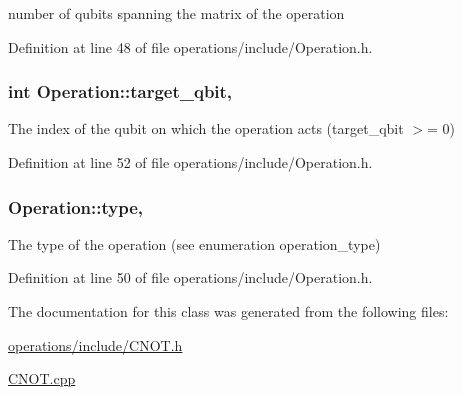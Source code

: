 number of qubits spanning the matrix of the operation 



Definition at line 48 of file operations/include/\+Operation.\+h.

\subsubsection[{\texorpdfstring{target\+\_\+qbit}{target_qbit}}]{\setlength{\rightskip}{0pt plus 5cm}int Operation\+::target\+\_\+qbit\hspace{0.3cm}{\ttfamily [protected]}, {\ttfamily [inherited]}}\hypertarget{class_operation_a3e489b72c124b494777c71b1646bb1e9}{}\label{class_operation_a3e489b72c124b494777c71b1646bb1e9}


The index of the qubit on which the operation acts (target\+\_\+qbit $>$= 0) 



Definition at line 52 of file operations/include/\+Operation.\+h.

\subsubsection[{\texorpdfstring{type}{type}}]{ Operation\+::type\hspace{0.3cm}{\ttfamily [protected]}, {\ttfamily [inherited]}}\hypertarget{class_operation_ad47c56c86d62a4c775571e1600416479}{}\label{class_operation_ad47c56c86d62a4c775571e1600416479}


The type of the operation (see enumeration operation\+\_\+type) 



Definition at line 50 of file operations/include/\+Operation.\+h.



The documentation for this class was generated from the following files\+:\begin{DoxyCompactItemize}
\item 
\hyperlink{operations_2include_2_c_n_o_t_8h}{operations/include/\+C\+N\+O\+T.\+h}\item 
\hyperlink{_c_n_o_t_8cpp}{C\+N\+O\+T.\+cpp}\end{DoxyCompactItemize}
